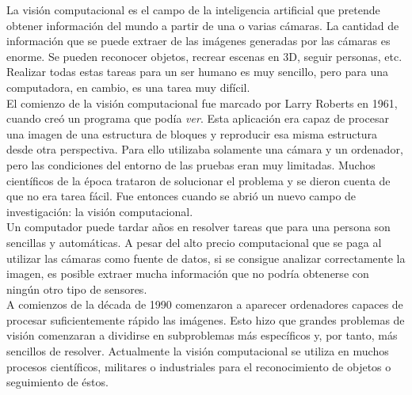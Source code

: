 La visión computacional es el campo de la inteligencia artificial que pretende obtener información del mundo a partir de una o varias cámaras. La cantidad de información que se puede extraer de las imágenes generadas por las cámaras es enorme. Se pueden reconocer objetos, recrear escenas en 3D, seguir personas, etc. Realizar todas estas tareas para un ser humano es muy sencillo, pero para una computadora, en cambio, es una tarea muy difícil.\\

El comienzo de la visión computacional fue marcado por Larry Roberts en 1961, cuando creó un programa que podía \textit{ver}. Esta aplicación era capaz de procesar una imagen de una estructura de bloques y reproducir esa misma estructura desde otra perspectiva. Para ello utilizaba solamente una cámara y un ordenador, pero las condiciones del entorno de las pruebas eran muy limitadas. Muchos científicos de la época trataron de solucionar el problema y se dieron cuenta de que no era tarea fácil. Fue entonces cuando se abrió un nuevo campo de investigación: la visión computacional.\\

Un computador puede tardar años en resolver tareas que para una persona son sencillas y automáticas. A pesar del alto precio computacional que se paga al utilizar las cámaras como fuente de datos, si se consigue analizar correctamente la imagen, es posible extraer mucha información que no podría obtenerse con ningún otro tipo de sensores.\\

A comienzos de la década de 1990 comenzaron a aparecer ordenadores capaces de procesar suficientemente rápido las imágenes. Esto hizo que grandes problemas de visión comenzaran a dividirse en subproblemas más específicos y, por tanto, más sencillos de resolver. Actualmente la visión computacional se utiliza en muchos procesos científicos, militares o industriales para el reconocimiento de objetos o seguimiento de éstos.\\

